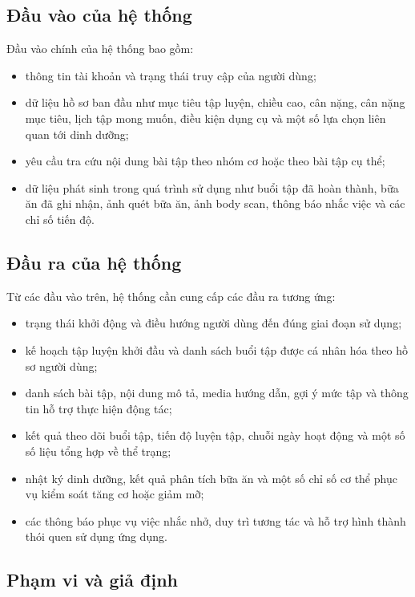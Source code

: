 \subsection{Đầu vào của hệ thống}

Đầu vào chính của hệ thống bao gồm:

\begin{itemize}
    \item thông tin tài khoản và trạng thái truy cập của người dùng;
    \item dữ liệu hồ sơ ban đầu như mục tiêu tập luyện, chiều cao, cân nặng, cân nặng mục tiêu, lịch tập mong muốn, điều kiện dụng cụ và một số lựa chọn liên quan tới dinh dưỡng;
    \item yêu cầu tra cứu nội dung bài tập theo nhóm cơ hoặc theo bài tập cụ thể;
    \item dữ liệu phát sinh trong quá trình sử dụng như buổi tập đã hoàn thành, bữa ăn đã ghi nhận, ảnh quét bữa ăn, ảnh body scan, thông báo nhắc việc và các chỉ số tiến độ.
\end{itemize}

\subsection{Đầu ra của hệ thống}

Từ các đầu vào trên, hệ thống cần cung cấp các đầu ra tương ứng:

\begin{itemize}
    \item trạng thái khởi động và điều hướng người dùng đến đúng giai đoạn sử dụng;
    \item kế hoạch tập luyện khởi đầu và danh sách buổi tập được cá nhân hóa theo hồ sơ người dùng;
    \item danh sách bài tập, nội dung mô tả, media hướng dẫn, gợi ý mức tập và thông tin hỗ trợ thực hiện động tác;
    \item kết quả theo dõi buổi tập, tiến độ luyện tập, chuỗi ngày hoạt động và một số số liệu tổng hợp về thể trạng;
    \item nhật ký dinh dưỡng, kết quả phân tích bữa ăn và một số chỉ số cơ thể phục vụ kiểm soát tăng cơ hoặc giảm mỡ;
    \item các thông báo phục vụ việc nhắc nhở, duy trì tương tác và hỗ trợ hình thành thói quen sử dụng ứng dụng.
\end{itemize}

\subsection{Phạm vi và giả định}

